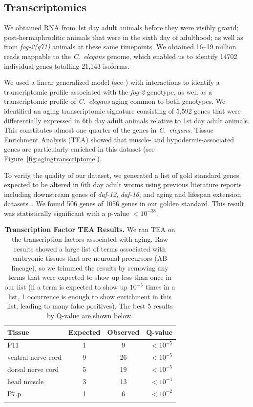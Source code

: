 \documentclass[10pt,letterpaper,twocolumn]{article}
\newcommand{\cel}{\emph{C.~elegans}}
\newcommand{\fog}{\emph{fog-2}}
\newcommand{\agen}{5,592}
\newcommand{\goldn}{1056}
\newcommand{\goldfound}{506}
\newcommand{\goldpval}{$<10^{-38}$}
\newcommand{\ra}[1]{\renewcommand{\arraystretch}{#1}}
\begin{document}
\subsection*{Transcriptomics}
\label{sub:Transcriptomics}

We obtained RNA from 1st day adult animals before they were visibly gravid; post-hermaphroditic animals that were in the sixth day of adulthood; as well as from \fog{}\emph{(q71)} animals at these same timepoints. We obtained 16--19 million reads mappable to the \cel{} genome, which enabled us to identify 14702 individual genes totalling 21,143 isoforms.

We used a linear generalized model (see ) with interactions to identify a transcriptomic profile associated with the \fog{} genotype, as well as a transcriptomic profile of \cel{} aging common to both genotypes. We identified an aging transcriptomic signature consisting of \agen{} genes that were differentially expressed in 6th day adult animals relative to 1st day adult animals. This constitutes almost one quarter of the genes in \cel{}. Tissue Enrichment Analysis (TEA) showed that muscle- and hypodermis-associated genes are particularly enriched in this dataset (see Figure~\ref{fig:agingtranscriptome}).

To verify the quality of our dataset, we generated a list of gold standard genes expected to be altered in 6th day adult worms using previous literature reports including downstream genes of \emph{daf-12}, \emph{daf-16}, and aging and lifespan extension datasets~\cite{Murphy2003,Halaschek-wiener2005,Lund2002,McCormick2012,Eckley2013}. We found \goldfound{} genes of \goldn{} genes in our golden standard. This result was statistically significant with a p-value \goldpval{}.

\begin{table}
\renewcommand{\familydefault}{\sfdefault}\normalfont{}
\centering{}
\ra{1.3}
\caption{\textbf{Transcription Factor TEA Results.} We ran TEA on the transcription factors associated with aging. Raw results showed a large list of terms associated with embryonic tissues that are neuronal precursors (AB lineage), so we trimmed the results by removing any terms that were expected to show up less than once in our list (if a term is expected to show up $10^{-3}$ times in a list, 1 occurrence is enough to show enrichment in this list, leading to many false positives). The best 5 results by Q-value are shown below.}
\begin{tabular}{@{}lccr@{}}
\toprule{}
Tissue & Expected & Observed & Q-value\\
\bottomrule{}
P11 & 1 & 9 & $<10^{-5}$\\
ventral nerve cord &	9 &	26 &	$<10^{-5}$\\
dorsal nerve cord &	5 &	19 & $<10^{-5}$\\
head muscle & 3	& 13 &	$<10^{-4}$\\
P7.p & 1 &	6	& $<10^{-2}$\\
\bottomrule{}
\end{tabular}
\label{tab:tea_tf_age}
\end{table}
\end{document}
